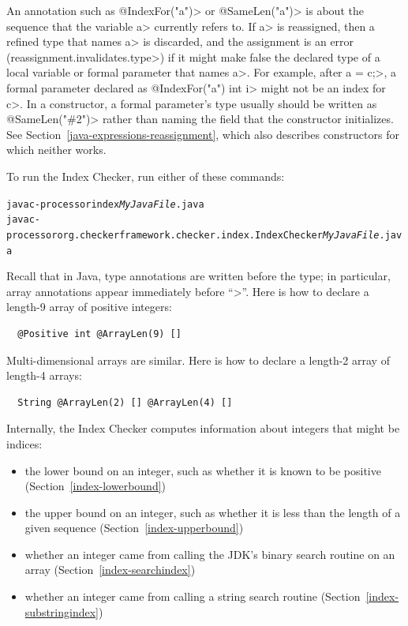An annotation such as \<@IndexFor("a")> or \<@SameLen("a")> is about the
sequence that the variable \<a> currently refers to.  If \<a> is
reassigned, then a refined type that names \<a> is discarded, and the
assignment is an error (\<reassignment.invalidates.type>) if it might make
false the declared type of a local variable or formal parameter that names
\<a>.  For example, after \<a = c;>, a formal parameter declared as
\<@IndexFor("a") int i> might not be an index for \<c>.  In a constructor,
a formal parameter's type usually should be written as \<@SameLen("\#2")>
rather than naming the field that the constructor initializes.  See
Section~\ref{java-expressions-reassignment}, which also describes
constructors for which neither works.

To run the Index Checker, run either of these commands:

\begin{alltt}
  javac -processor index \emph{MyJavaFile}.java
  javac -processor org.checkerframework.checker.index.IndexChecker \emph{MyJavaFile}.java
\end{alltt}

Recall that in Java, type annotations are written before the type;
in particular,
array annotations appear immediately before ``\<[]>''.
Here is how to declare a length-9 array of positive integers:

\begin{Verbatim}
  @Positive int @ArrayLen(9) []
\end{Verbatim}

Multi-dimensional arrays are similar.
Here is how to declare a length-2 array of length-4 arrays:

\begin{Verbatim}
  String @ArrayLen(2) [] @ArrayLen(4) []
\end{Verbatim}



Internally, the Index Checker computes information about integers that
might be indices:
\begin{itemize}
\item
  the lower bound on an integer, such as whether it is known to be positive
  (Section~\ref{index-lowerbound})
\item
  the upper bound on an integer, such as whether it is less than the length
  of a given sequence (Section~\ref{index-upperbound})
\item
  whether an integer came from calling the JDK's binary search routine on
  an array (Section~\ref{index-searchindex})
\item
  whether an integer came from calling a string search routine
  (Section~\ref{index-substringindex})
\end{itemize}

